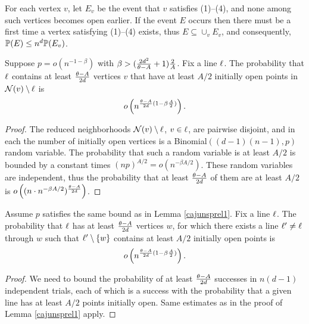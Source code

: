 For each vertex $v$, let $E_v$ be the event that $v$ satisfies (1)--(4), and none among
such vertices becomes open earlier. If the event $E$ occurs then there must be 
a first time a vertex satisfying (1)--(4) exists, thus $E \subseteq \cup_v E_v$, and
consequently, $\mathbb{P}(E) \le n^d \mathbb{P}(E_v)$.

\begin{lemma}\label{cajunsprel1}
Suppose $p = o(n^{-1-\beta})$ with $\beta > (\frac{2d^2}{\theta-A}+1)\frac{2}{A}$.  Fix a line $\ell$. The probability that $\ell$ contains at least $\frac{\theta-A}{2d}$ vertices $v$ 
that have at least $A/2$ initially open points in $\mathcal{N}(v)\setminus \ell$  is 
$$%
o\left(n^{\frac{\threshold-A}{2d}(1-\beta\frac{A}{2})}\right).
$$
\end{lemma}
\begin{proof}
The reduced neighborhoods $\mathcal{N}(v)\setminus \ell$, $v\in\ell$, are pairwise 
disjoint, and in each
the number of initially open vertices is a Binomial$((d-1)(n-1),p)$ random variable.
The probability that such a random variable is at least $A/2$ is bounded 
by a constant times $(np)^{A/2}=o\left(n^{-\beta A/2}\right)$. These
random variables are independent, thus the probability that at least $\frac{\theta-A}{2d}$ of them
are at least $A/2$ is  $o\left((n\cdot n^{-\beta A/2})^\frac{\theta-A}{2d}\right)$.
\end{proof}

\begin{lemma}\label{cajunsprel2}
Assume $p$ satisfies the same bound as in Lemma \ref{cajunsprel1}. 
Fix a line $\ell$. The probability that $\ell$ has at least $\frac{\theta-A}{2d}$ vertices $w$,
for which there exists a line $\ell'\ne \ell$ through $w$ such that 
$\ell'\setminus \{w\}$ contains at least $A/2$ initially open points is 
$$o\left(n^{\frac{\theta-A}{2d}(1-\beta\frac{A}{2})}\right).$$
\end{lemma}
\begin{proof} We need to bound the probability of at least  
$\frac{\theta-A}{2d}$ successes in 
$n(d-1)$ independent trials, each of which is a success with  
the probability that a given line has at least $A/2$ points initially open. 
Same estimates as in the proof of Lemma \ref{cajunsprel1} apply.
\end{proof}


